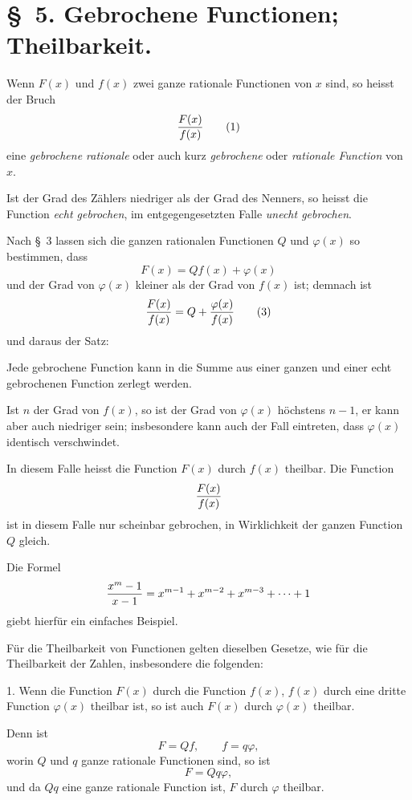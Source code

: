 \documentclass[11pt]{article}
\begin{document}
\clearpage
\clearpage

\section*{\S~5. Gebrochene Functionen; Theilbarkeit.}

Wenn $F(x)$ und $f(x)$ zwei ganze rationale Functionen von $x$ sind, so heisst der Bruch
\begin{equation}
 {F(x)\over f(x)}
\tag{1}
\end{equation}
eine \emph{gebrochene rationale} oder auch kurz \emph{gebrochene} oder \emph{rationale Function} von $x$.

Ist der Grad des Zählers niedriger als der Grad des Nenners, so heisst die Function \emph{echt gebrochen}, im entgegengesetzten Falle \emph{unecht gebrochen}.

Nach \S~3 lassen sich die ganzen rationalen Functionen $Q$ und $\varphi(x)$ so bestimmen, dass
\begin{equation}
 F(x)=Qf(x)+\varphi(x)
\tag{2}
\end{equation}
und der Grad von $\varphi(x)$ kleiner als der Grad von $f(x)$ ist; demnach ist
\begin{equation}
 {F(x)\over f(x)}=Q+{\varphi(x)\over f(x)}
\tag{3}
\end{equation}
und daraus der Satz:

Jede gebrochene Function kann in die Summe aus einer ganzen und einer echt gebrochenen Function zerlegt werden.

Ist $n$ der Grad von $f(x)$, so ist der Grad von $\varphi(x)$ höchstens $n-1$, er kann aber auch niedriger sein; insbesondere kann auch der Fall eintreten, dass $\varphi(x)$ identisch verschwindet.

In diesem Falle heisst die Function $F(x)$ durch $f(x)$ theilbar. Die Function
\[
 {F(x)\over f(x)}
\]
ist in diesem Falle nur scheinbar gebrochen, in Wirklichkeit der ganzen Function $Q$ gleich.

Die Formel
\[
 {x^m-1\over x-1}=x^{m-1}+x^{m-2}+x^{m-3}+\cdots+1
\]
giebt hierfür ein einfaches Beispiel.

Für die Theilbarkeit von Functionen gelten dieselben Gesetze, wie für die Theilbarkeit der Zahlen, insbesondere die folgenden:

1. Wenn die Function $F(x)$ durch die Function $f(x)$, $f(x)$ durch eine dritte Function $\varphi(x)$ theilbar ist, so ist auch $F(x)$ durch $\varphi(x)$ theilbar.

Denn ist
\[
 F=Qf,
 \qquad
 f=q\varphi,
\]
worin $Q$ und $q$ ganze rationale Functionen sind, so ist
\[
 F=Qq\varphi,
\]
und da $Qq$ eine ganze rationale Function ist, $F$ durch $\varphi$ theilbar.
\end{document}
